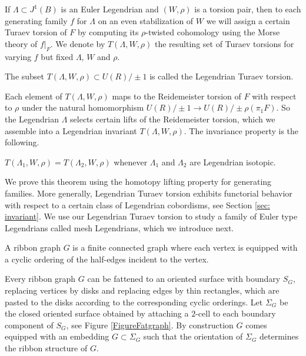 If $\Lambda \subset J^1(B)$ is an Euler Legendrian and $(W,\rho)$ is a torsion pair, then to each generating family $f$ for $\Lambda$ on an even stabilization of $W$ we will assign a certain Turaev torsion of $F$ by computing its $\rho$-twisted cohomology using the Morse theory of $f|_F$. We denote by $T(\Lambda, W, \rho)$ the resulting set of Turaev torsions for varying $f$ but fixed $\Lambda$, $W$ and $\rho$.

\begin{definition} The subset $T(\Lambda, W, \rho) \subset U(R) / \pm1$ is called the Legendrian Turaev torsion. \end{definition}

Each element of $T(\Lambda,W,\rho)$ maps to the Reidemeister torsion of $F$ with respect to $\rho$ under the natural homomorphism $U(R) / \pm 1 \to U(R) / \pm \rho(\pi_1 F)$. So the Legendrian $\Lambda$ selects certain lifts of the Reidemeister torsion, which we assemble into a Legendrian invariant $T(\Lambda, W, \rho)$. The invariance property is the following.
\begin{theorem} $T(\Lambda_1,W,\rho)=T(\Lambda_2, W, \rho)$ whenever $\Lambda_1$ and $\Lambda_2$ are Legendrian isotopic.
\end{theorem}
We prove this theorem using the homotopy lifting property for generating families. More generally, Legendrian Turaev torsion exhibits functorial behavior with respect to a certain class of Legendrian cobordisms, see Section \ref{sec: invariant}. We use our Legendrian Turaev torsion to study a family of Euler type Legendrians called mesh Legendrians, which we introduce next.

\begin{definition} A ribbon graph $G$ is a finite connected graph where each vertex is equipped with a cyclic ordering of the half-edges incident to the vertex.
\end{definition}

Every ribbon graph $G$ can be fattened to an oriented surface with boundary $S_G$, replacing vertices by disks and replacing edges by thin rectangles, which are pasted to the disks according to the corresponding cyclic orderings. Let $\Sigma_G$ be the closed oriented surface obtained by attaching a $2$-cell to each boundary component of $S_G$, see Figure \ref{FigureFatgraph}. By construction $G$ comes equipped with an embedding $G \subset \Sigma_G$ such that the orientation of $\Sigma_G$ determines the ribbon structure of $G$.

